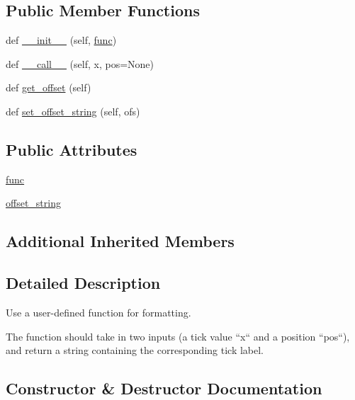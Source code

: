 \subsection*{Public Member Functions}
\begin{DoxyCompactItemize}
\item 
def \hyperlink{classmatplotlib_1_1ticker_1_1FuncFormatter_a2519ab045f5a27cc46e079aeadaa0a68}{\+\_\+\+\_\+init\+\_\+\+\_\+} (self, \hyperlink{classmatplotlib_1_1ticker_1_1FuncFormatter_a576e6111eb4733628e026664cfdf33fe}{func})
\item 
def \hyperlink{classmatplotlib_1_1ticker_1_1FuncFormatter_a3c985f8c3e613685925a93404aa7da24}{\+\_\+\+\_\+call\+\_\+\+\_\+} (self, x, pos=None)
\item 
def \hyperlink{classmatplotlib_1_1ticker_1_1FuncFormatter_a16c299481515ba1def666af21e047af1}{get\+\_\+offset} (self)
\item 
def \hyperlink{classmatplotlib_1_1ticker_1_1FuncFormatter_a4a5502d592e818f4d863ea256acee4c5}{set\+\_\+offset\+\_\+string} (self, ofs)
\end{DoxyCompactItemize}
\subsection*{Public Attributes}
\begin{DoxyCompactItemize}
\item 
\hyperlink{classmatplotlib_1_1ticker_1_1FuncFormatter_a576e6111eb4733628e026664cfdf33fe}{func}
\item 
\hyperlink{classmatplotlib_1_1ticker_1_1FuncFormatter_ab94ceaf94e148bb8c5291d26c2b3253c}{offset\+\_\+string}
\end{DoxyCompactItemize}
\subsection*{Additional Inherited Members}


\subsection{Detailed Description}
\begin{DoxyVerb}Use a user-defined function for formatting.

The function should take in two inputs (a tick value ``x`` and a
position ``pos``), and return a string containing the corresponding
tick label.
\end{DoxyVerb}
 

\subsection{Constructor \& Destructor Documentation}
\mbox{\label{classmatplotlib_1_1ticker_1_1FuncFormatter_a2519ab045f5a27cc46e079aeadaa0a68}} 
